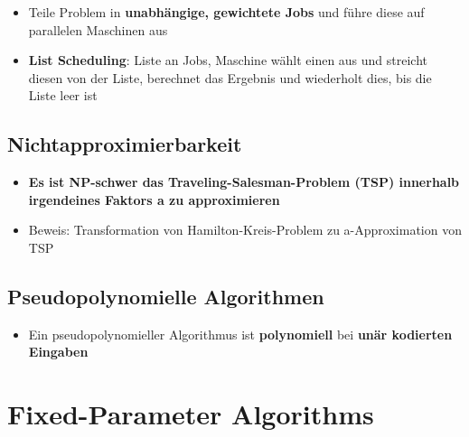 \documentclass[10pt,a4paper]{article}
\begin{document}
	\begin{itemize}
		\item Teile Problem in \textbf{unabhängige, gewichtete Jobs} und führe diese auf parallelen Maschinen aus
		\item \textbf{List Scheduling}: Liste an Jobs, Maschine wählt einen aus und streicht diesen von der Liste, berechnet das Ergebnis und wiederholt dies, bis die Liste leer ist
	\end{itemize}

	\subsection{Nichtapproximierbarkeit}
	\label{aa:sub:nichtapproximierbarkeit}
	
	\begin{itemize}
		\item \textbf{Es ist NP-schwer das Traveling-Salesman-Problem (TSP) innerhalb irgendeines Faktors a zu approximieren}
		\item Beweis: Transformation von Hamilton-Kreis-Problem zu a-Approximation von TSP
	\end{itemize}

	\subsection{Pseudopolynomielle Algorithmen}
	\label{aa:sub:pseudopolynomielle_algorithmen}
	
	\begin{itemize}
		\item Ein pseudopolynomieller Algorithmus ist \textbf{polynomiell} bei \textbf{unär kodierten Eingaben}
	\end{itemize}

	\newpage
	\section{Fixed-Parameter Algorithms}
	\label{fpa:sec:fixed_parameter_algorithms}
	
\end{document}
